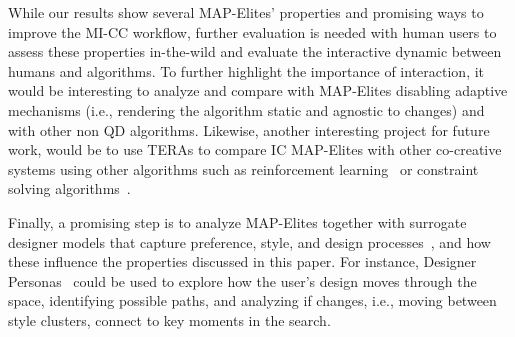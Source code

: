 While our results show several MAP-Elites’ properties and promising ways to improve the MI-CC workflow, further evaluation is needed with human users to assess these properties in-the-wild and evaluate the interactive dynamic between humans and algorithms. To further highlight the importance of interaction, it would be interesting to analyze and compare with MAP-Elites disabling adaptive mechanisms (i.e., rendering the algorithm static and agnostic to changes) and with other non QD algorithms. Likewise, another interesting project for future work, would be to use TERAs to compare IC MAP-Elites with other co-creative systems using other algorithms such as reinforcement learning~ or constraint solving algorithms~.
 




Finally, a promising step is to analyze MAP-Elites together with surrogate designer models that capture preference, style, and design processes~, and how these influence the properties discussed in this paper. For instance, Designer Personas~ could be used to explore how the user's design moves through the space, identifying possible paths, and analyzing if changes, i.e., moving between style clusters, connect to key moments in the search.